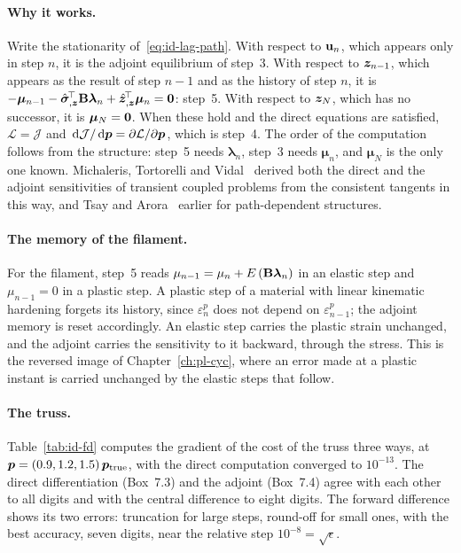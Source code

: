 \paragraph{Why it works.} Write the stationarity of~\eqref{eq:id-lag-path}. With
respect to $\mathbf{u}_n$, which appears only in step $n$, it is the adjoint
equilibrium of step~3. With respect to $\bm{z}_{n-1}$, which appears as the result
of step $n-1$ and as the history of step $n$, it is
$-\boldsymbol\mu_{n-1}-\hat{\bm{\sigma}}_{,\bm{z}}^{\!\top}\mathbf{B}\boldsymbol\lambda_n+\hat{\bm{z}}_{,\bm{z}}^{\!\top}\boldsymbol\mu_n=\bm{0}$:
step~5. With respect to $\bm{z}_N$, which has no successor, it is
$\boldsymbol\mu_N=\bm{0}$. When these hold and the direct equations are satisfied,
$\mathcal L=\mathcal J$ and $\,\mathrm{d}\mathcal J/\,\mathrm{d}\bm{p}=\partial\mathcal L/\partial\bm{p}$, which is
step~4. The order of the computation follows from the structure: step~5 needs
$\boldsymbol\lambda_n$, step~3 needs $\boldsymbol\mu_n$, and $\boldsymbol\mu_N$ is the only
one known. Michaleris, Tortorelli and Vidal~\cite{MichalerisTortorelliVidal1994}
derived both the direct and the adjoint sensitivities of transient coupled
problems from the consistent tangents in this way, and Tsay and
Arora~\cite{TsayArora1990} earlier for path-dependent structures.

\paragraph{The memory of the filament.}
For the filament, step~5 reads $\mu_{n-1}=\mu_n+E\,(\mathbf{B}\boldsymbol\lambda_n)$ in an
elastic step and $\mu_{n-1}=0$ in a plastic step. A plastic step of a material
with linear kinematic hardening forgets its history, since $\varepsilon^p_n$ does
not depend on $\varepsilon^p_{n-1}$; the adjoint memory is reset accordingly. An
elastic step carries the plastic strain unchanged, and the adjoint carries the
sensitivity to it backward, through the stress. This is the reversed image of
Chapter~\ref{ch:pl-cyc}, where an error made at a plastic instant is carried
unchanged by the elastic steps that follow.

\paragraph{The truss.}
Table~\ref{tab:id-fd} computes the gradient of the cost of the truss three ways,
at $\bm{p}=(0.9,1.2,1.5)\,\bm{p}_{\mathrm{true}}$, with the direct computation converged to
$10^{-13}$. The direct differentiation (Box~7.3) and the adjoint (Box~7.4) agree
with each other to all digits and with the central difference to eight digits.
The forward difference shows its two errors: truncation for large steps, round-off
for small ones, with the best accuracy, seven digits, near the relative step
$10^{-8}=\sqrt{\epsilon}$.

